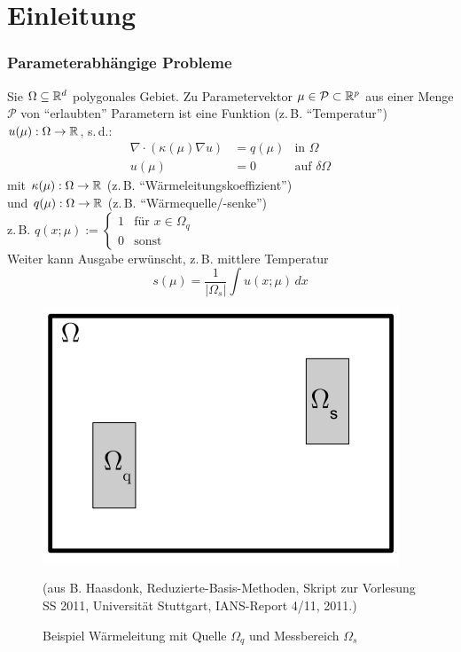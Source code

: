 \section{Einleitung}
\label{sec-1}

\subsubsection*{Parameterabhängige Probleme}
\label{Parameterabhängige Probleme}

\begin{bsp}
	Sie $\Omega \subseteq \mathbb{R}^d$ polygonales Gebiet. Zu Parametervektor $\mu \in \mathcal{P} \subset \mathbb{R}^p$ aus einer Menge $\mathcal{P}$ von "`erlaubten"' Parametern ist eine Funktion (z.\,B. "`Temperatur"') $u(\mu): \Omega \rightarrow \mathbb{R}$, s.\,d.:
	\begin{align*}
		\nabla \cdot (\kappa(\mu) \nabla u) &= q(\mu) & \text{in } \Omega \\
		u(\mu) &= 0 & \text{auf } \delta\Omega
	\end{align*}
	mit $\kappa(\mu) : \Omega \rightarrow \mathbb{R}$ (z.\,B. "`Wärmeleitungskoeffizient"') \\
	und $q(\mu) : \Omega \rightarrow \mathbb{R}$ (z.\,B. "`Wärmequelle/-senke"') \\
	
	z.\,B. $q(x;\mu) := \begin{cases}
			1 & \text{für } x \in \Omega_q \\
			0 & \text{sonst}
		\end{cases}$
\\

Weiter kann Ausgabe erwünscht, z.\,B. mittlere Temperatur
	\[
		s(\mu) = \frac{1}{|\Omega_s|} \int u(x; \mu) \,dx
	\]
	
\begin{figure}[H]
  \centering\small
    \includegraphics[width = 0.5 \textwidth]{Bilder/MittlereTemp.png}
  \caption{Beispiel Wärmeleitung mit Quelle $\Omega_q$ und Messbereich $\Omega_s$}{(aus B. Haasdonk, Reduzierte-Basis-Methoden, Skript zur Vorlesung SS 2011, Universität Stuttgart, IANS-Report 4/11, 2011.)}
  \label{fig:MittlereTemp}
\end{figure}
\end{bsp}

